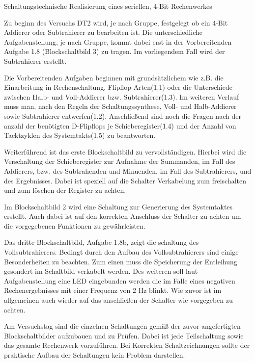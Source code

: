 

	Schaltungstechnische Realisierung eines seriellen, 4-Bit Rechenwerkes	
	
	Zu beginn des Versuchs DT2 wird, je nach Gruppe, festgelegt ob ein 4-Bit 
	Addierer oder Subtrahierer zu bearbeiten ist.
	Die unterschiedliche Aufgabenstellung, je nach Gruppe, kommt dabei erst
	in der Vorbereitenden Aufgabe 1.8 (Blockschaltbild 3) zu tragen.
	Im vorliegendem Fall wird der Subtrahierer erstellt.
	
	Die Vorbereitenden Aufgaben beginnen mit grundsätzlichem wie z.B. die 					Einarbeitung in Rechenschaltung, Flipflop-Arten(1.1) oder die Unterschiede 
	zwischen Halb- und Voll-Addierer bzw. Subtrahierer(1.3). 
	Im weiteren Verlauf muss man, nach den Regeln der Schaltungssynthese, 
	Voll- und Halb-Addierer sowie Subtrahierer entwerfen(1.2).
	Anschließend sind noch die Fragen nach der anzahl der benötigten
	D-Flipflops je Schieberegister(1.4) und der Anzahl von Tacktzyklen des 
	Systemtakts(1.5) zu beantworten.
	
	Weiterführend ist das erste Blockschaltbild zu vervollständigen.
	Hierbei wird die Verschaltung der Schieberegister zur Aufnahme der 
	Summanden, im Fall des Addierers, bzw. des Subtrahenden und Minuenden, 
	im Fall des Subtrahierers, und des Ergebnisses.
	Dabei ist speziell auf die Schalter Verkabelung zum freischalten und zum 
	löschen der Register zu achten.
	
	Im Blockschaltbild 2 wird eine Schaltung zur Generierung des Systemtaktes
	erstellt. Auch dabei ist auf den korrekten Anschluss der Schalter zu 
	achten um die vorgegebenen Funktionen zu gewährleisten. 
	
	Das dritte Blockschaltbild, Aufgabe 1.8b, zeigt die schaltung 
	des Vollsubtrahierers.
	Bedingt durch den Aufbau des Vollsubtrahierers sind einige Besonderheiten
	zu beachten. Zum einen muss die Speicherung der Entleihung gesondert im 
	Schaltbild verkabelt werden. Des weiteren soll laut Aufgabenstellung eine 
	LED eingebunden werden die im Falle eines negativen Rechenergebnisses 
	mit einer Frequenz von 2 Hz blinkt. Wie zuvor ist im allgemeinen auch wieder
	auf das anschließen der Schalter wie vorgegeben zu achten.
	
	Am Versuchstag sind die einzelnen Schaltungen gemäß der zuvor angefertigten 
	Blockschaltbilder aufzubauen und zu Prüfen.
	Dabei ist jede Teilschaltung sowie das gesamte Rechenwerk vorzuführen.
	Bei Korrekten Schaltzeichnungen sollte der praktische Aufbau der Schaltungen
	kein Problem darstellen. 